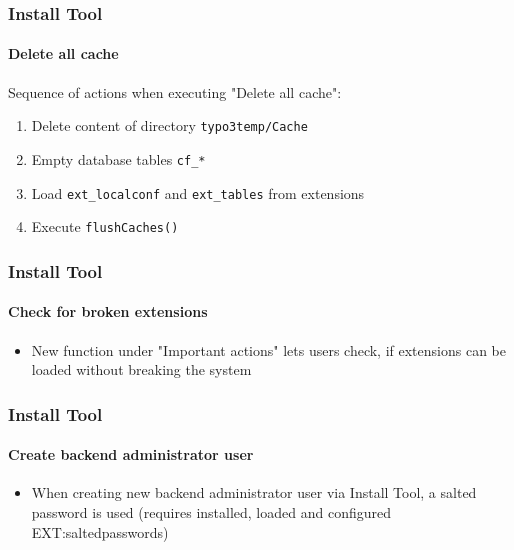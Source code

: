 
\begin{frame}[fragile]
	\frametitle{Install Tool}
	\framesubtitle{Delete all cache}

	Sequence of actions when executing "Delete all cache":

	\begin{enumerate}
		\item Delete content of directory \texttt{typo3temp/Cache}
		\item Empty database tables \texttt{cf\_*}
		\item Load \texttt{ext\_localconf} and \texttt{ext\_tables} from extensions
		\item Execute \texttt{flushCaches()}
	\end{enumerate}

\end{frame}


\begin{frame}[fragile]
	\frametitle{Install Tool}
	\framesubtitle{Check for broken extensions}

	\begin{itemize}
		\item New function under "Important actions" lets users check,\newline
			if extensions can be loaded without breaking the system
	\end{itemize}


\end{frame}


\begin{frame}[fragile]
	\frametitle{Install Tool}
	\framesubtitle{Create backend administrator user}

	\begin{itemize}
		\item When creating new backend administrator user via Install Tool,\newline
			a salted password is used
			(requires installed, loaded and configured EXT:saltedpasswords)
	\end{itemize}


\end{frame}

